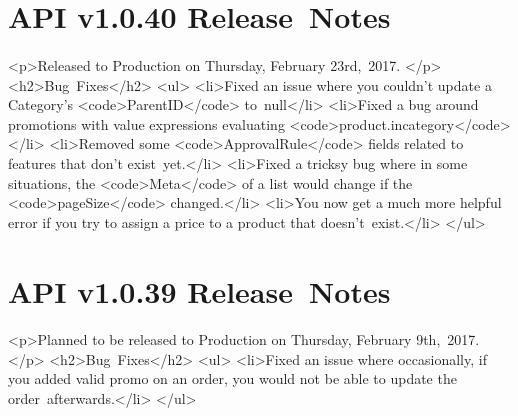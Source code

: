 \documentclass{memoir}%
\begin{document}
%
\section*{API v1.0.40 Release~Notes}%
\paragraph*{}%

%
\paragraph*{}%
<p>Released to Production on Thursday, February 23rd,~2017. </p>\newline%
<h2>Bug~Fixes</h2>\newline%
<ul>\newline%
<li>Fixed an issue where you couldn’t update a Category’s <code>ParentID</code> to~null</li>\newline%
<li>Fixed a bug around promotions with value expressions evaluating <code>product.incategory</code></li>\newline%
<li>Removed some <code>ApprovalRule</code> fields related to features that don’t exist~yet.</li>\newline%
<li>Fixed a tricksy bug where in some situations, the <code>Meta</code> of a list would change if the <code>pageSize</code> changed.</li>\newline%
<li>You now get a much more helpful error if you try to assign a price to a product that doesn’t~exist.</li>\newline%
</ul>

%
\section*{API v1.0.39 Release~Notes}%
\paragraph*{}%

%
\paragraph*{}%
<p>Planned to be released to Production on Thursday, February 9th,~2017. </p>\newline%
<h2>Bug~Fixes</h2>\newline%
<ul>\newline%
<li>Fixed an issue where occasionally, if you added valid promo on an order, you would not be able to update the order~afterwards.</li>\newline%
</ul>
\end{document}
